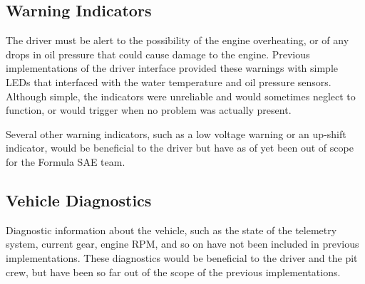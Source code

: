 \subsection{Warning Indicators}

The driver must be alert to the possibility of the engine overheating, or of any drops in oil pressure that could cause damage to the engine. Previous implementations of the driver interface provided these warnings with simple LEDs that interfaced with the water temperature and oil pressure sensors. Although simple, the indicators were unreliable and would sometimes neglect to function, or would trigger when no problem was actually present. 

Several other warning indicators, such as a low voltage warning or an up-shift indicator, would be beneficial to the driver but have as of yet been out of scope for the Formula SAE team.

\subsection{Vehicle Diagnostics}

Diagnostic information about the vehicle, such as the state of the telemetry system, current gear, engine RPM, and so on have not been included in previous implementations. These diagnostics would be beneficial to the driver and the pit crew, but have been so far out of the scope of the previous implementations.

